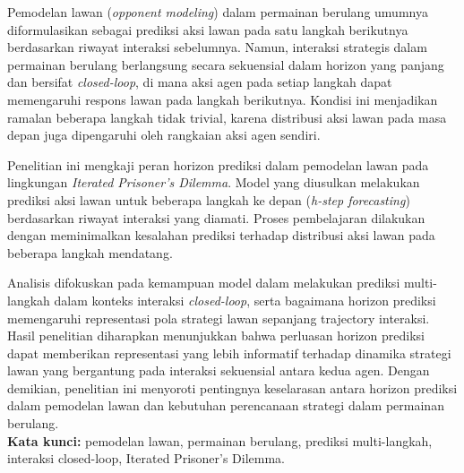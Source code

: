 \abstractind
Pemodelan lawan (\textit{opponent modeling}) dalam permainan berulang umumnya diformulasikan sebagai prediksi aksi lawan pada satu langkah berikutnya berdasarkan riwayat interaksi sebelumnya. Namun, interaksi strategis dalam permainan berulang berlangsung secara sekuensial dalam horizon yang panjang dan bersifat \textit{closed-loop}, di mana aksi agen pada setiap langkah dapat memengaruhi respons lawan pada langkah berikutnya. Kondisi ini menjadikan ramalan beberapa langkah tidak trivial, karena distribusi aksi lawan pada masa depan juga dipengaruhi oleh rangkaian aksi agen sendiri.

Penelitian ini mengkaji peran horizon prediksi dalam pemodelan lawan pada lingkungan \textit{Iterated Prisoner's Dilemma}. Model yang diusulkan melakukan prediksi aksi lawan untuk beberapa langkah ke depan (\textit{h-step forecasting}) berdasarkan riwayat interaksi yang diamati. Proses pembelajaran dilakukan dengan meminimalkan kesalahan prediksi terhadap distribusi aksi lawan pada beberapa langkah mendatang.

Analisis difokuskan pada kemampuan model dalam melakukan prediksi multi-langkah dalam konteks interaksi \textit{closed-loop}, serta bagaimana horizon prediksi memengaruhi representasi pola strategi lawan sepanjang trajectory interaksi. Hasil penelitian diharapkan menunjukkan bahwa perluasan horizon prediksi dapat memberikan representasi yang lebih informatif terhadap dinamika strategi lawan yang bergantung pada interaksi sekuensial antara kedua agen. Dengan demikian, penelitian ini menyoroti pentingnya keselarasan antara horizon prediksi dalam pemodelan lawan dan kebutuhan perencanaan strategi dalam permainan berulang.\\

\noindent\textbf{Kata kunci:} pemodelan lawan, permainan berulang, prediksi multi-langkah, interaksi closed-loop, Iterated Prisoner’s Dilemma.
\endabstractind


